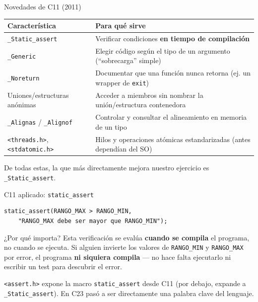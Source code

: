 \documentclass[aspectratio=169]{beamer}
\begin{document}
\begin{frame}{Novedades de C11 (2011)}
    \small
    \begin{table}
        \begin{tabular}{p{4.3cm}p{7.5cm}}
            \toprule
            \textbf{Característica} & \textbf{Para qué sirve} \\
            \midrule
            \texttt{\_Static\_assert} & Verificar condiciones \textbf{en tiempo de compilación} \\
            \texttt{\_Generic} & Elegir código según el tipo de un argumento (``sobrecarga'' simple) \\
            \texttt{\_Noreturn} & Documentar que una función nunca retorna (ej. un wrapper de \texttt{exit}) \\
            Uniones/estructuras anónimas & Acceder a miembros sin nombrar la unión/estructura contenedora \\
            \texttt{\_Alignas} / \texttt{\_Alignof} & Controlar y consultar el alineamiento en memoria de un tipo \\
            \texttt{<threads.h>}, \texttt{<stdatomic.h>} & Hilos y operaciones atómicas estandarizadas (antes dependían del SO) \\
            \bottomrule
        \end{tabular}
    \end{table}

    \vspace{0.3em}
    \small De todas estas, la que más directamente mejora nuestro ejercicio
    es \texttt{\_Static\_assert}.
\end{frame}

\begin{frame}[fragile]{C11 aplicado: \texttt{static\_assert}}
    \begin{lstlisting}
static_assert(RANGO_MAX > RANGO_MIN,
    "RANGO_MAX debe ser mayor que RANGO_MIN");
    \end{lstlisting}

    \vspace{0.5em}
    \begin{alertblock}{¿Por qué importa?}
        Esta verificación se evalúa \textbf{cuando se compila} el programa,
        no cuando se ejecuta. Si alguien invierte los valores de
        \texttt{RANGO\_MIN} y \texttt{RANGO\_MAX} por error, el programa
        \textbf{ni siquiera compila} — no hace falta ejecutarlo ni escribir
        un test para descubrir el error.
    \end{alertblock}

    \vspace{0.3em}
    \small \texttt{<assert.h>} expone la macro \texttt{static\_assert} desde
    C11 (por debajo, expande a \texttt{\_Static\_assert}). En C23 pasó a ser
    directamente una palabra clave del lenguaje.
\end{frame}
\end{document}

